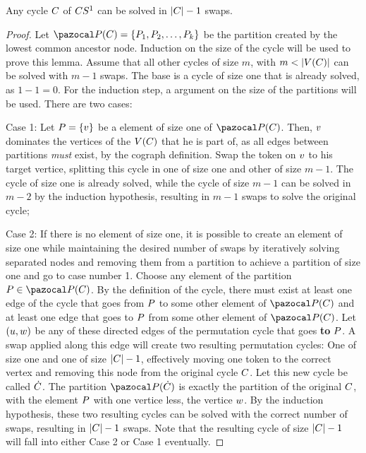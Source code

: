 \documentclass[msc]{ppgccufmg}    %
\begin{document}

\begin{lemma}
\label{lem:s_onecycle}
Any cycle $C$ of $CS^{1}$ can be solved in $|C| - 1$ swaps.
\end{lemma}

\begin{proof}
Let $\partitionFunc{\cycle} = \createSet{\partitionElem_{1}, \partitionElem_{2}, 
\ldots, \partitionElem_{k}}$ be the partition created by the lowest common
ancestor node.
Induction on the size of the cycle will be used to prove this lemma.
Assume that all other cycles of size $m$, with $m < |V(C)|$ 
can be solved with $m - 1$ swaps.
The base is a cycle of size one that is already solved, as $1-1 = 0$.
For the induction step, a argument on the size of the partitions will be used.
There are two cases:

Case 1: Let $P = \{v\}$ be a element of size 
one of $\partitionFunc{\cycle}$.
Then, $v$ dominates the vertices of the $V(C)$ that he 
is part of, as all edges between partitions \textit{must} exist, by the cograph
definition.
Swap the token on $v$ to his target vertice, splitting this cycle in
one of size one and other of size $m - 1$.
The cycle of size one is already solved, while the cycle of size $m - 1$ can
be solved in $m - 2$ by the induction hypothesis, resulting in $m - 1$ swaps
to solve the original cycle;

Case 2: If there is no element of size one, it is possible to create an element
of size one while maintaining the desired number of swaps by iteratively 
solving separated nodes and removing them from a partition to achieve a 
partition of size one and go to case number 1.
Choose any element of the partition $\partitionElem \in \partitionFunc{\cycle}$.
By the definition of the cycle, there must exist at least one edge of the cycle
that goes from $P$ to some other element of $\partitionFunc{\cycle}$
and at least one edge that goes to $P$ from some other element of
$\partitionFunc{\cycle}$.
Let $(u, w)$ be any of these directed edges of the permutation 
cycle that goes \textbf{to} $P$.
A swap applied along this edge will create two resulting permutation cycles: One 
of size one and one of size $|C| - 1$, effectively moving one token 
to the correct vertex and removing this node from the original cycle $C$.
Let this new cycle be called $\dot{C}$.
The partition $\partitionFunc{\sub{\cycle}}$ is exactly the partition of the 
original $C$, with the element $P$ with one vertice less,
the vertice $w$.
By the induction hypothesis, these two resulting cycles can be solved with
the correct number of swaps, resulting in $|C| - 1$ swaps.
Note that the resulting cycle of size $|C| - 1$ will fall into either
Case 2 or Case 1 eventually.
\end{proof}
\end{document}

